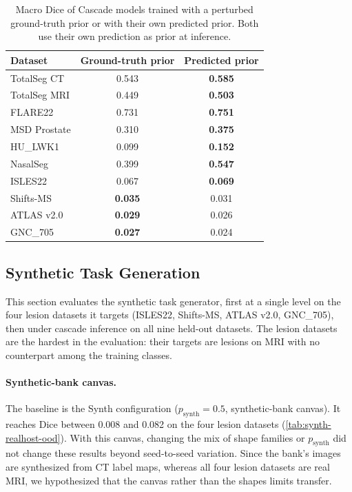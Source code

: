 \documentclass[hidelinks, a4paper, 12pt, ngerman, english]{article}  %
\begin{document}
\begin{table}[t]
  \centering
  \small
  \caption{Macro Dice of Cascade models trained with a perturbed ground-truth
  prior or with their own predicted prior. Both use their own prediction as
  prior at inference.}
  \label{tab:cascade-ablation}
  \begin{tabular}{@{}lcc@{}}
    \toprule
    Dataset & Ground-truth prior & Predicted prior \\
    \midrule
    TotalSeg CT     & 0.543 & \textbf{0.585} \\
    TotalSeg MRI    & 0.449 & \textbf{0.503} \\
    FLARE22         & 0.731 & \textbf{0.751} \\
    \midrule
    MSD Prostate    & 0.310 & \textbf{0.375} \\
    HU\_LWK1        & 0.099 & \textbf{0.152} \\
    NasalSeg        & 0.399 & \textbf{0.547} \\
    \midrule
    ISLES22         & 0.067 & \textbf{0.069} \\
    Shifts-MS       & \textbf{0.035} & 0.031 \\
    ATLAS v2.0      & \textbf{0.029} & 0.026 \\
    GNC\_705        & \textbf{0.027} & 0.024 \\
    \bottomrule
  \end{tabular}
\end{table}
\subsection{Synthetic Task Generation}\label{sec:results-synth}

This section evaluates the synthetic task generator, first at a single level
on the four lesion datasets it targets (ISLES22, Shifts-MS, ATLAS v2.0,
GNC\_705), then under cascade inference on all nine held-out datasets. The
lesion datasets are the hardest in the evaluation: their targets are lesions
on MRI with no counterpart among the training classes.


\paragraph{Synthetic-bank canvas.}
The baseline is the Synth configuration ($p_\text{synth} = 0.5$,
synthetic-bank canvas). It reaches Dice between 0.008 and 0.082 on the four
lesion datasets (\autoref{tab:synth-realhost-ood}). With this canvas, changing
the mix of shape families or $p_\text{synth}$ did not change these results
beyond seed-to-seed variation. Since the bank's images are synthesized from CT
label maps, whereas all four lesion datasets are real MRI, we hypothesized
that the canvas rather than the shapes limits transfer.
\end{document}
